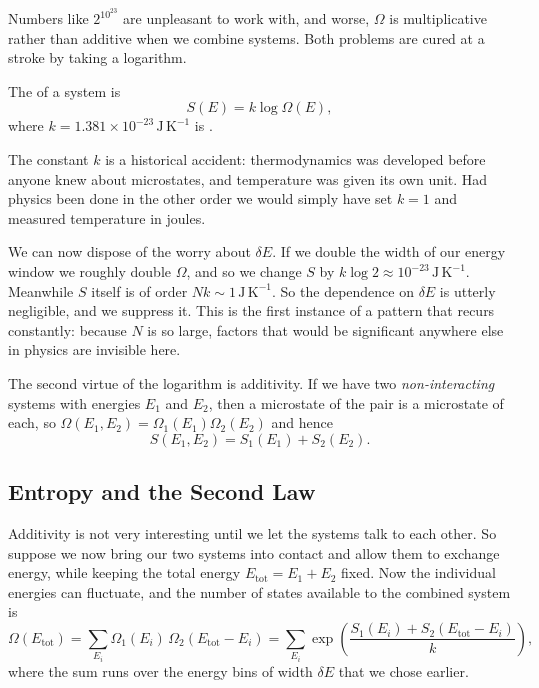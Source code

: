 Numbers like $2^{10^{23}}$ are unpleasant to work with, and worse, $\Omega$ is multiplicative rather than additive when we combine systems. Both problems are cured at a stroke by taking a logarithm.

\begin{definition}
	The  of a system is
	$$
	S(E) = k \log \Omega(E),
	$$
	where $k = 1.381 \times 10^{-23}\,\mathrm{J}\,\mathrm{K}^{-1}$ is .
\end{definition}

The constant $k$ is a historical accident: thermodynamics was developed before anyone knew about microstates, and temperature was given its own unit. Had physics been done in the other order we would simply have set $k = 1$ and measured temperature in joules.

We can now dispose of the worry about $\delta E$. If we double the width of our energy window we roughly double $\Omega$, and so we change $S$ by $k \log 2 \approx 10^{-23}\,\mathrm{J}\,\mathrm{K}^{-1}$. Meanwhile $S$ itself is of order $Nk \sim 1\,\mathrm{J}\,\mathrm{K}^{-1}$. So the dependence on $\delta E$ is utterly negligible, and we suppress it. This is the first instance of a pattern that recurs constantly: because $N$ is so large, factors that would be significant anywhere else in physics are invisible here.

The second virtue of the logarithm is additivity. If we have two \emph{non-interacting} systems with energies $E_1$ and $E_2$, then a microstate of the pair is a microstate of each, so $\Omega(E_1, E_2) = \Omega_1(E_1)\Omega_2(E_2)$ and hence
$$
S(E_1, E_2) = S_1(E_1) + S_2(E_2).
$$

\subsection{Entropy and the Second Law}

Additivity is not very interesting until we let the systems talk to each other. So suppose we now bring our two systems into contact and allow them to exchange energy, while keeping the total energy $E_{\mathrm{tot}} = E_1 + E_2$ fixed. Now the individual energies can fluctuate, and the number of states available to the combined system is
$$
\Omega(E_{\mathrm{tot}}) = \sum_{E_i} \Omega_1(E_i)\, \Omega_2(E_{\mathrm{tot}} - E_i) = \sum_{E_i} \exp\left( \frac{S_1(E_i) + S_2(E_{\mathrm{tot}} - E_i)}{k}\right),
$$
where the sum runs over the energy bins of width $\delta E$ that we chose earlier.

